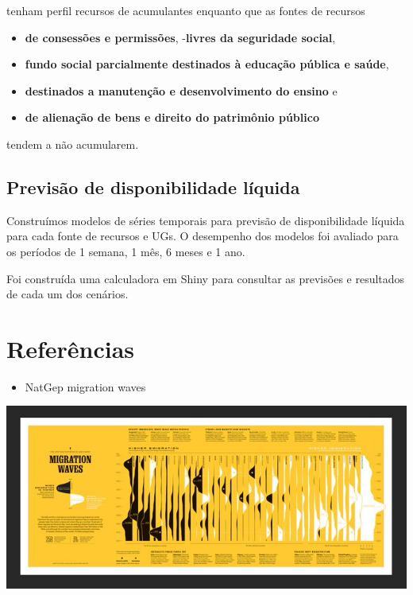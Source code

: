 \documentclass[
]{book}
\providecommand{\tightlist}{%
  \setlength{\itemsep}{0pt}\setlength{\parskip}{0pt}}
\begin{document}
tenham perfil recursos de acumulantes enquanto que as fontes de recursos

\begin{itemize}
\tightlist
\item
  \textbf{de consessões e permissões},
  -\textbf{livres da seguridade social},
\item
  \textbf{fundo social parcialmente destinados à educação pública e saúde},
\item
  \textbf{destinados a manutenção e desenvolvimento do ensino} e
\item
  \textbf{de alienação de bens e direito do patrimônio público}
\end{itemize}

tendem a não acumularem.

\hypertarget{previsuxe3o-de-disponibilidade-luxedquida}{%
\section{Previsão de disponibilidade líquida}\label{previsuxe3o-de-disponibilidade-luxedquida}}

Construímos modelos de séries temporais para previsão de disponibilidade líquida para cada fonte de recursos e UGs.
O desempenho dos modelos foi avaliado para os períodos de 1 semana, 1 mês, 6 meses e 1 ano.

Foi construída uma calculadora em Shiny para consultar as previsões e resultados de cada um dos cenários.

\hypertarget{referuxeancias}{%
\chapter*{Referências}\label{referuxeancias}}

\begin{itemize}
\tightlist
\item
  NatGep migration waves
\end{itemize}

\includegraphics{natgeo.jpg}
\end{document}
